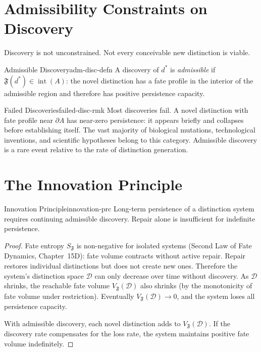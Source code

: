 \documentclass[12pt,twoside,openright]{book}
\newcommand{\distset}{\mathcal{D}}        %
\newcommand{\fateMap}{\mathfrak{F}}
\newcommand{\admRegion}{A}
\providecommand{\admRegion}{A}
\providecommand{\fateVol}[1]{V_{\fateMap}(#1)}
\providecommand{\fateEnt}{S_{\fateMap}}
\begin{document}
\section{Admissibility Constraints on Discovery}

Discovery is not unconstrained. Not every conceivable new
distinction is viable.

\begin{definition}{Admissible Discovery}{adm-disc-defn}
A discovery of $d^*$ is \emph{admissible} if
$\fateMap(d^*)\in\operatorname{int}(\admRegion)$: the novel
distinction has a fate profile in the interior of the admissible
region and therefore has positive persistence capacity.
\end{definition}

\begin{remark}{Failed Discoveries}{failed-disc-rmk}
Most discoveries fail. A novel distinction with fate profile
near $\partial\admRegion$ has near-zero persistence: it appears
briefly and collapses before establishing itself. The vast
majority of biological mutations, technological inventions,
and scientific hypotheses belong to this category. Admissible
discovery is a rare event relative to the rate of distinction
generation.
\end{remark}

\section{The Innovation Principle}

\begin{principle}{Innovation Principle}{innovation-prc}
Long-term persistence of a distinction system requires
continuing admissible discovery. Repair alone is insufficient
for indefinite persistence.
\begin{proof}
Fate entropy $\fateEnt$ is non-negative for isolated systems
(Second Law of Fate Dynamics, Chapter~15D): fate volume
contracts without active repair. Repair restores individual
distinctions but does not create new ones. Therefore the
system's distinction space $\distset$ can only decrease over
time without discovery. As $\distset$ shrinks, the reachable
fate volume $\fateVol{\distset}$ also shrinks (by the
monotonicity of fate volume under restriction). Eventually
$\fateVol{\distset}\to 0$, and the system loses all
persistence capacity.

With admissible discovery, each novel distinction adds to
$\fateVol{\distset}$. If the discovery rate compensates for
the loss rate, the system maintains positive fate volume
indefinitely.
\end{proof}
\end{principle}
\end{document}
